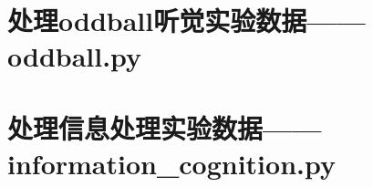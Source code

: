 \documentclass{hitreport}
\begin{document}
\newpage
\begin{appendices}

\section{处理oddball听觉实验数据——oddball.py}\label{app:oddball}



\section{处理信息处理实验数据——information\_cognition.py}\label{app:information}


%
%
%
%
%
%

\end{appendices}
\end{document}
